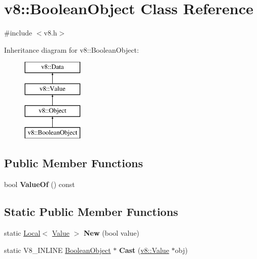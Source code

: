 \hypertarget{classv8_1_1_boolean_object}{}\section{v8\+:\+:Boolean\+Object Class Reference}
\label{classv8_1_1_boolean_object}


{\ttfamily \#include $<$v8.\+h$>$}

Inheritance diagram for v8\+:\+:Boolean\+Object\+:\begin{figure}[H]
\begin{center}
\leavevmode
\includegraphics[height=4.000000cm]{classv8_1_1_boolean_object}
\end{center}
\end{figure}
\subsection*{Public Member Functions}
\begin{DoxyCompactItemize}
\item 
\hypertarget{classv8_1_1_boolean_object_a283419656e641bcd9588dee56c0a0686}{}bool {\bfseries Value\+Of} () const \label{classv8_1_1_boolean_object_a283419656e641bcd9588dee56c0a0686}

\end{DoxyCompactItemize}
\subsection*{Static Public Member Functions}
\begin{DoxyCompactItemize}
\item 
\hypertarget{classv8_1_1_boolean_object_af57ca9198a6c6d00617da80b3f705e37}{}static \hyperlink{classv8_1_1_local}{Local}$<$ \hyperlink{classv8_1_1_value}{Value} $>$ {\bfseries New} (bool value)\label{classv8_1_1_boolean_object_af57ca9198a6c6d00617da80b3f705e37}

\item 
\hypertarget{classv8_1_1_boolean_object_ac701398c9b1c74fbce31d66106c9a87f}{}static V8\+\_\+\+I\+N\+L\+I\+N\+E \hyperlink{classv8_1_1_boolean_object}{Boolean\+Object} $\ast$ {\bfseries Cast} (\hyperlink{classv8_1_1_value}{v8\+::\+Value} $\ast$obj)\label{classv8_1_1_boolean_object_ac701398c9b1c74fbce31d66106c9a87f}

\end{DoxyCompactItemize}
